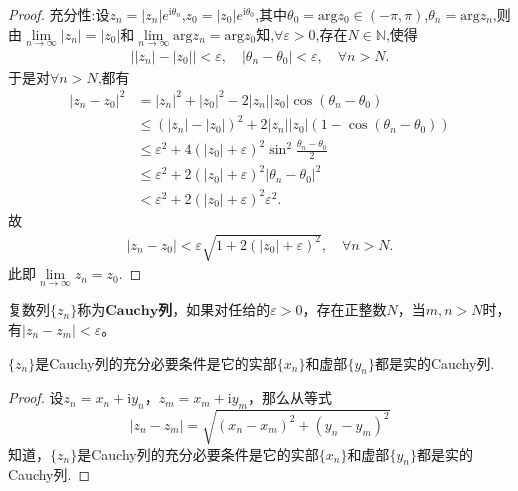\documentclass[../../main.tex]{subfiles}%
\begin{document}
\begin{proof}
{\heiti 充分性:}设$z_n=\left| z_n \right|e^{\mathrm{i}\theta _n}$,$z_0=\left| z_0 \right|e^{\mathrm{i}\theta _0}$,其中$\theta _0=\mathrm{arg}z_0\in \left( -\pi ,\pi \right)$,$\theta _n=\mathrm{arg}z_n$,则由$\lim\limits_{n\rightarrow \infty}\left| z_n \right|=\left| z_0 \right|$和$\lim\limits_{n\rightarrow \infty}\mathrm{arg}z_n=\mathrm{arg}z_0$知,$\forall \varepsilon >0$,存在$N\in \mathbb{N}$,使得
\begin{align*}
\left| \left| z_n \right|-\left| z_0 \right| \right|<\varepsilon,\quad \left| \theta _n-\theta _0 \right|<\varepsilon,\quad \forall n>N.
\end{align*}
于是对$\forall n>N$,都有
\begin{align*}
\left| z_n-z_0 \right|^2&=\left| z_n \right|^2+\left| z_0 \right|^2-2\left| z_n \right|\left| z_0 \right|\cos \left( \theta _n-\theta _0 \right) \\
&\leqslant \left( \left| z_n \right|-\left| z_0 \right| \right) ^2+2\left| z_n \right|\left| z_0 \right|\left( 1-\cos \left( \theta _n-\theta _0 \right) \right) \\
&\leqslant \varepsilon ^2+4\left( \left| z_0 \right|+\varepsilon \right) ^2\sin ^2\frac{\theta _n-\theta _0}{2} \\
&\leqslant \varepsilon ^2+2\left( \left| z_0 \right|+\varepsilon \right) ^2\left| \theta _n-\theta _0 \right|^2 \\
&<\varepsilon ^2+2\left( \left| z_0 \right|+\varepsilon \right) ^2\varepsilon ^2.
\end{align*}
故
\begin{align*}
\left| z_n-z_0 \right|<\varepsilon \sqrt{1+2\left( \left| z_0 \right|+\varepsilon \right) ^2},\quad \forall n>N.
\end{align*}
此即$\lim\limits_{n\rightarrow \infty}z_n=z_0$.

\end{proof}

\begin{definition}
复数列\(\{ z_n \}\)称为\(\mathbf{Cauchy}\)\textbf{列}，如果对任给的\(\varepsilon > 0\)，存在正整数\(N\)，当\(m, n > N\)时，有\(| z_n - z_m | < \varepsilon\)。
\end{definition}

\begin{theorem}\label{theorem:复数Cauchy列充要条件}
\(\{ z_n \}\)是Cauchy列的充分必要条件是它的实部\(\{ x_n \}\)和虚部\(\{ y_n \}\)都是实的Cauchy列.
\end{theorem}
\begin{proof}

设\(z_n = x_n + \mathrm{i}y_n\)，\(z_m = x_m + \mathrm{i}y_m\)，那么从等式
\[
| z_n - z_m | = \sqrt{(x_n - x_m)^2 + (y_n - y_m)^2}
\]
知道，\(\{ z_n \}\)是Cauchy列的充分必要条件是它的实部\(\{ x_n \}\)和虚部\(\{ y_n \}\)都是实的Cauchy列.

\end{proof}
\end{document}
